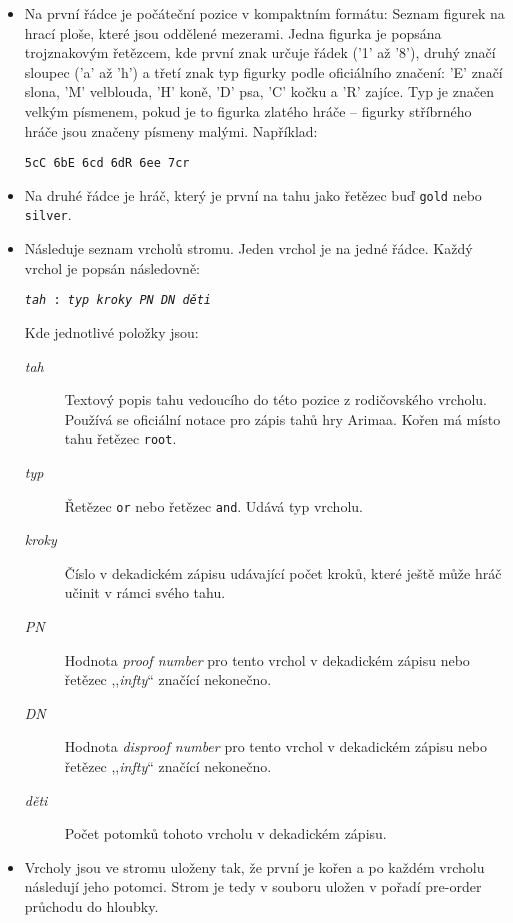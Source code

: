 \documentclass{article}
\begin{document}
\begin{itemize}
\item Na první řádce je počáteční pozice v kompaktním formátu: Seznam figurek
  na hrací ploše, které jsou oddělené mezerami. Jedna figurka je popsána 
  trojznakovým řetězcem, kde první znak určuje řádek ('1' až '8'), druhý značí
  sloupec ('a' až 'h') a třetí znak typ figurky podle oficiálního značení: 'E'
  značí slona, 'M' velblouda, 'H' koně, 'D' psa, 'C' kočku a 'R' zajíce. Typ je 
  značen velkým písmenem, pokud je to figurka zlatého hráče -- figurky 
  stříbrného hráče jsou značeny písmeny malými. Například: \begin{center}
  \texttt{5cC 6bE 6cd 6dR 6ee 7cr}\end{center}
\item Na druhé řádce je hráč, který je první na tahu jako řetězec buď 
  \texttt{gold} nebo \texttt{silver}.
\item Následuje seznam vrcholů stromu. Jeden vrchol je na jedné řádce. Každý
  vrchol je popsán následovně: \begin{center}
    \texttt{\textit{tah} : \textit{typ} \textit{kroky} \textit{PN} \textit{DN} 
      \textit{děti}}
    \end{center}
  Kde jednotlivé položky jsou:\begin{description}
  \item[\textit{tah}] Textový popis tahu vedoucího do této pozice z
    rodičovského vrcholu. Používá se oficiální notace pro zápis tahů hry Arimaa. 
    Kořen má místo tahu řetězec \texttt{root}.
  \item[\textit{typ}] Řetězec \texttt{or} nebo řetězec \texttt{and}. Udává typ 
    vrcholu.
  \item[\textit{kroky}] Číslo v dekadickém zápisu udávající počet kroků, které 
    ještě může hráč učinit v rámci svého tahu.
  \item[\textit{PN}] Hodnota \emph{proof number} pro tento vrchol v dekadickém 
    zápisu nebo řetězec ,,\textit{infty}`` značící nekonečno.
  \item[\textit{DN}] Hodnota \emph{disproof number} pro tento vrchol v 
    dekadickém zápisu nebo řetězec ,,\textit{infty}`` značící nekonečno.
  \item[\textit{děti}] Počet potomků tohoto vrcholu v dekadickém zápisu.
  \end{description}
\item Vrcholy jsou ve stromu uloženy tak, že první je kořen a po každém vrcholu 
  následují jeho potomci. Strom je tedy v souboru uložen v pořadí pre-order 
  průchodu do hloubky.
\end{itemize}
\end{document}
